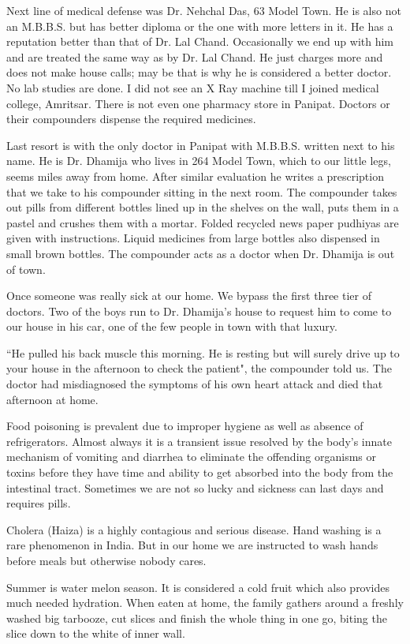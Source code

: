 Next line of medical defense was Dr. Nehchal Das, 63 Model Town. He is
also not an M.B.B.S. but has better diploma or the one with more letters
in it. He has a reputation better than that of Dr. Lal Chand. Occasionally
we end up with him and are treated the same way as by Dr. Lal Chand. He
just charges more and does not make house calls; may be that is why he is
considered a better doctor. No lab studies are done. I did not see an
X Ray machine till I joined medical college, Amritsar. There is not even
one pharmacy store in Panipat. Doctors or their compounders dispense the
required medicines. 

Last resort is with the only doctor in Panipat with M.B.B.S. written next
to his name. He is Dr. Dhamija who lives in 264 Model Town, which to our
little legs, seems miles away from home. After similar evaluation he
writes a prescription that we take to his compounder sitting in the next
room. The compounder takes out pills from different bottles lined up in
the shelves on the wall, puts them in a pastel and crushes them with
a mortar. Folded recycled news paper pudhiyas are given with instructions.
Liquid medicines from large bottles also dispensed in small brown bottles.
The compounder acts as a doctor when Dr. Dhamija is out of town. 

Once someone was really sick at our home. We bypass the first three tier
of doctors. Two of the boys run to Dr. Dhamija's house to request him to
come to our house in his car, one of the few people in town with that
luxury. 

“He pulled his back muscle this morning. He is resting but will surely
drive up to your house in the afternoon to check the patient", the
compounder told us. The doctor had misdiagnosed the symptoms of his own
heart attack and died that afternoon at home. 

Food poisoning is prevalent due to improper hygiene as well as absence of
refrigerators. Almost always it is a transient issue resolved by the
body's innate mechanism of vomiting and diarrhea to eliminate the
offending organisms or toxins before they have time and ability to get
absorbed into the body from the intestinal tract. Sometimes we are not so
lucky and sickness can last days and requires pills. 

Cholera (Haiza) is a highly contagious and serious disease. Hand washing
is a rare phenomenon in India. But in our home we are instructed to wash
hands before meals but otherwise nobody cares. 

Summer is water melon season. It is considered a cold fruit which also
provides much needed hydration. When eaten at home, the family gathers
around a freshly washed big tarbooze, cut slices and finish the whole
thing in one go, biting the slice down to the white of inner wall. 

